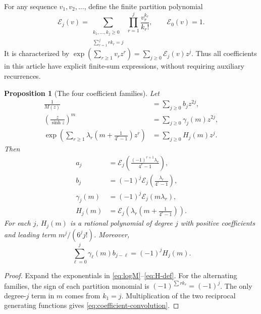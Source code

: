 \documentclass[11pt,a4paper]{article}
\numberwithin{equation}{section}
\newtheorem{proposition}[proposition]{Proposition}
\theoremstyle{definition}
\newcommand{\Part}[1]{\substack{k_1,\ldots,k_{#1}\geq0\\\sum_{r=1}^{#1}rk_r=#1}}
\begin{document}
For any sequence $v_1,v_2,\ldots$, define the finite partition polynomial
\begin{equation}
 \mathcal E_j(v)=
 \sum_{\Part{j}}\prod_{r=1}^j\frac{v_r^{k_r}}{k_r!},
 \qquad \mathcal E_0(v)=1.
 \label{eq:partition-polynomial}
\end{equation}
It is characterized by
$\exp(\sum_{r\geq1}v_rz^r)=\sum_{j\geq0}\mathcal E_j(v)z^j$.
Thus all coefficients in this article have explicit finite-sum
expressions, without requiring auxiliary recurrences.

\begin{proposition}[The four coefficient families]\label{prop:coeff-families}
Let
\begin{align}
 \frac1{M(z)}&=\sum_{j\geq0}b_jz^{2j},\label{eq:b-def}\\
 \left(\frac z{\sinh z}\right)^m&=
      \sum_{j\geq0}\gamma_j(m)z^{2j},\label{eq:gamma-def}\\
 \exp\left(\sum_{r\geq1}\lambda_r
           \left(m+\frac1{4^r-1}\right)z^r\right)
      &=\sum_{j\geq0}H_j(m)z^j.\label{eq:H-def}
\end{align}
Then
\begin{align}
 a_j&=\mathcal E_j\left(
        \frac{(-1)^{r+1}\lambda_r}{4^r-1}\right),\label{eq:a-partition}\\
 b_j&=(-1)^j\mathcal E_j\left(\frac{\lambda_r}{4^r-1}\right),\label{eq:b-partition}\\
 \gamma_j(m)&=(-1)^j\mathcal E_j(m\lambda_r),\label{eq:gamma-partition}\\
 H_j(m)&=\mathcal E_j\left(\lambda_r
                     \left(m+\frac1{4^r-1}\right)\right).
 \label{eq:H-partition}
\end{align}
For each $j$, $H_j(m)$ is a rational polynomial of degree $j$ with
positive coefficients and leading term $m^j/(6^j j!)$. Moreover,
\begin{equation}
 \sum_{\ell=0}^j\gamma_\ell(m)b_{j-\ell}=(-1)^jH_j(m).
 \label{eq:coefficient-convolution}
\end{equation}
\end{proposition}
\begin{proof}
Expand the exponentials in \eqref{eq:logM}--\eqref{eq:H-def}.
For the alternating families, the sign of each partition monomial
is $(-1)^{\sum rk_r}=(-1)^j$. The only degree-$j$ term in $m$ comes
from $k_1=j$. Multiplication of the two reciprocal generating
functions gives \eqref{eq:coefficient-convolution}.
\end{proof}
\end{document}
